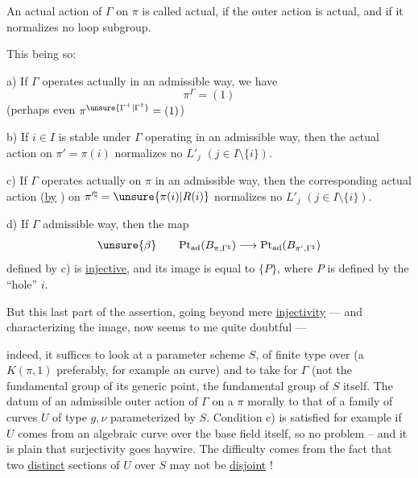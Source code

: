 An actual action of $\Gamma$ on $\pi$ is called actual,  if the outer action is actual, and if it normalizes no loop subgroup.

This being so:

a) If $\Gamma$ operates actually in an admissible way, we have
\[
\pi^\Gamma=(1)
\]
(perhaps even $\pi^{\unsure{\Gamma^+|\Gamma^\dagger}}=(1)$) 






b) If $i\in I$ is stable under $\Gamma$ operating  in an admissible way, then the actual action on $\pi'=\pi(i)$ normalizes no $L'_j$ $(j\in I\setminus\{i\})$.

c) If $\Gamma$ operates actually on $\pi$ in an admissible way,  then the corresponding actual action (\uline{by} ) on $\pi^{\prime\natural}=\unsure{\pi(i)|R(i)}$ normalizes no $L'_j$ $(j\in I\setminus\{i\})$.

d) If $\Gamma$  admissible way, then the map
\[
\unsure{\beta}\qquad
\mathrm{Pt}_{\mathrm{ad}}(B_{\pi,\Gamma^{\natural}})\longrightarrow
\mathrm{Pt}_{\mathrm{ad}}(B_{\pi',\Gamma^{\natural}})
\]
defined by c) is \uline{injective}, and  its image is  equal to $\{P\}$, where $P$ is defined by the ``hole'' $i$.

But this last part of the assertion, going beyond mere \uline{injectivity} --- and characterizing the image, now seems to me quite doubtful ---


indeed, it suffices to look at a parameter scheme $S$, of finite type over  (a $K(\pi,1)$ preferably, for example an  curve) and to take for $\Gamma$ (not the fundamental group of its generic point,   the fundamental group of $S$ itself. The datum of an admissible outer action of $\Gamma$ on a $\pi$  morally to that of a family of curves $U$ of type $g,\nu$ parameterized by $S$. Condition c) is satisfied for example if $U$ comes from an algebraic curve over the base field itself, so no problem -- and it is plain that surjectivity goes haywire. The difficulty comes from the fact that two \uline{distinct} sections of $U$ over $S$ may not be \uline{disjoint} !

